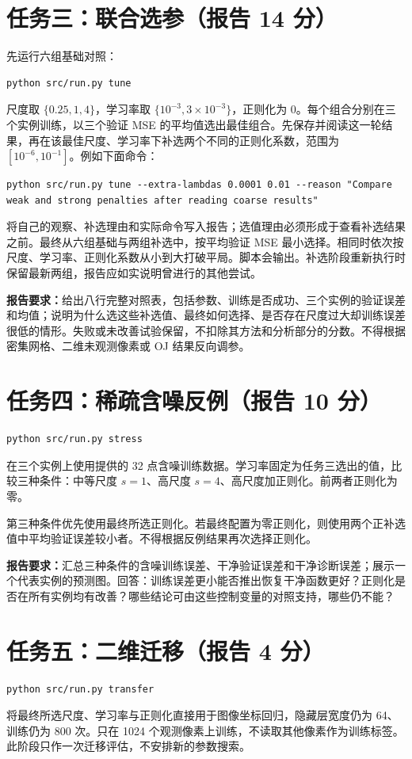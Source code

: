 \documentclass[11pt,a4paper]{article}
\newcommand{\code}[1]{\texttt{\small\detokenize{#1}}}
\begin{document}
\section{任务三：联合选参（报告 14 分）}
先运行六组基础对照：
\begin{lstlisting}
python src/run.py tune
\end{lstlisting}
尺度取 $\{0.25,1,4\}$，学习率取 $\{10^{-3},3\times10^{-3}\}$，正则化为 $0$。每个组合分别在三个实例训练，以三个验证 MSE 的平均值选出最佳组合。先保存并阅读这一轮结果，再在该最佳尺度、学习率下补选两个不同的正则化系数，范围为 $[10^{-6},10^{-1}]$。例如下面命令：
\begin{lstlisting}
python src/run.py tune --extra-lambdas 0.0001 0.01 --reason "Compare weak and strong penalties after reading coarse results"
\end{lstlisting}
将自己的观察、补选理由和实际命令写入报告；选值理由必须形成于查看补选结果之前。最终从六组基础与两组补选中，按平均验证 MSE 最小选择。相同时依次按尺度、学习率、正则化系数从小到大打破平局。脚本会输出\code{recommended_config}。补选阶段重新执行时保留最新两组，报告应如实说明曾进行的其他尝试。

\textbf{报告要求：}给出八行完整对照表，包括参数、训练是否成功、三个实例的验证误差和均值；说明为什么选这些补选值、最终如何选择、是否存在尺度过大却训练误差很低的情形。失败或未改善试验保留，不扣除其方法和分析部分的分数。不得根据密集网格、二维未观测像素或 OJ 结果反向调参。

\section{任务四：稀疏含噪反例（报告 10 分）}
\begin{lstlisting}
python src/run.py stress
\end{lstlisting}
在三个实例上使用提供的 32 点含噪训练数据。学习率固定为任务三选出的值，比较三种条件：中等尺度 $s=1$、高尺度 $s=4$、高尺度加正则化。前两者正则化为零。

第三种条件优先使用最终所选正则化。若最终配置为零正则化，则使用两个正补选值中平均验证误差较小者。不得根据反例结果再次选择正则化。

\textbf{报告要求：}汇总三种条件的含噪训练误差、干净验证误差和干净诊断误差；展示一个代表实例的预测图。回答：训练误差更小能否推出恢复干净函数更好？正则化是否在所有实例均有改善？哪些结论可由这些控制变量的对照支持，哪些仍不能？


\section{任务五：二维迁移（报告 4 分）}
\begin{lstlisting}
python src/run.py transfer
\end{lstlisting}
将最终所选尺度、学习率与正则化直接用于图像坐标回归，隐藏层宽度仍为 64、训练仍为 800 次。只在 1024 个观测像素上训练，不读取其他像素作为训练标签。此阶段只作一次迁移评估，不安排新的参数搜索。
\end{document}
